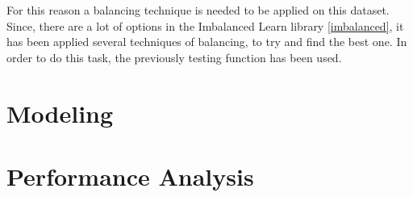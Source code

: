 \documentclass[../main]{subfiles}
\begin{document}
For this reason a balancing technique is needed to be applied on this dataset. Since, there are a lot of options in the Imbalanced Learn library \ref{imbalanced}, it has been applied several techniques of balancing, to try and find the best one. In order to do this task, the previously testing function has been used.
\section{Modeling}
\section{Performance Analysis}
\end{document}
